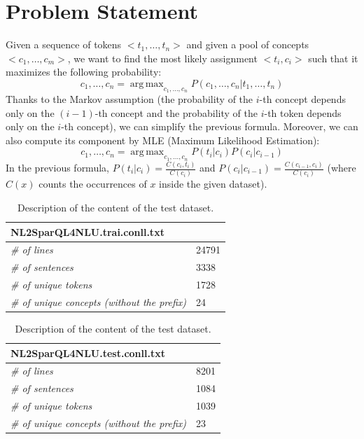 \documentclass[11pt,a4paper]{article}
\DeclareMathOperator*{\argmax}{arg\,max}
\begin{document}
\section{Problem Statement}
Given a sequence of tokens $<t_1, \ldots, t_n>$ and given a pool of concepts $<c_1, \ldots, c_m>$, we want to find the most likely assignment $<t_i, c_i>$ such that it maximizes the following probability:
\begin{equation}
c_1, \ldots, c_n = \argmax_{c_1, \ldots, c_n} P (c_1, \ldots, c_n | t_1, \ldots, t_n)
\label{frm:argmax}
\end{equation}
Thanks to the Markov assumption (the probability of the $i$-th concept depends only on the $(i-1)$-th concept and the probability of the $i$-th token depends only on the $i$-th concept), we can simplify the previous formula. Moreover, we can also compute its component by MLE (Maximum Likelihood Estimation):
\begin{equation}
c_1, \ldots, c_n = \argmax_{c_1, \ldots, c_n} P(t_i|c_i)P(c_i| c_{i-1})
\label{frm:argmax-markov-assumption}
\end{equation}
In the previous formula, $P(t_i|c_i) = \frac{C(c_i, t_i)}{C(c_i)}$ and $P(c_i|c_{i-1}) = \frac{C(c_{i-1}, c_i)}{C(c_i)}$ (where $C(x)$ counts the occurrences of $x$ inside the given dataset). 

\begin{table}[b!]
    \begin{subtable}{.5\linewidth}
		\centering
\begin{tabular}{|l|l|}
\hline
\multicolumn{2}{|l|}{\textbf{NL2SparQL4NLU.trai.conll.txt}} \\ \hline
\textit{\# of lines}									& 24791 \\ \hline
\textit{\# of sentences}                             & 3338 \\ \hline
\textit{\# of unique tokens}                         & 1728 \\ \hline
\textit{\# of unique concepts (without the prefix)}  & 24   \\ \hline
\end{tabular}
\caption{Description of the content of the train dataset.}
\end{subtable}%
\begin{subtable}{.5\linewidth}
\centering
\begin{tabular}{|l|l|}
\hline
\multicolumn{2}{|l|}{\textbf{NL2SparQL4NLU.test.conll.txt}} \\ \hline
\textit{\# of lines}									& 8201 \\ \hline
\textit{\# of sentences}                             & 1084 \\ \hline
\textit{\# of unique tokens}                         & 1039 \\ \hline
\textit{\# of unique concepts (without the prefix)}  & 23   \\ \hline
\end{tabular}
\caption{Description of the content of the test dataset.}
\label{tab:test-dataset-description}
\end{subtable}
\end{table} 
\end{document}
